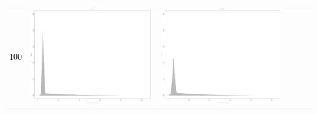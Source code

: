 \begin{table}[htbp]
{\begin{tabular}{l | ccccc}
		100	   & \begin{minipage}{.085\textwidth}\vspace{2pt}     							
     			 	\includegraphics[width=\linewidth]{images/mema-dens-graph/N3}
    				 \end{minipage}
    			   & \begin{minipage}{.085\textwidth}\vspace{2pt}     							
     			 	\includegraphics[width=\linewidth]{images/mema-dens-graph/N7}
    				 \end{minipage}
    			   &	 \begin{minipage}{.085\textwidth}\vspace{2pt}     							

\end{minipage}
\end{tabular}}
\end{table}
